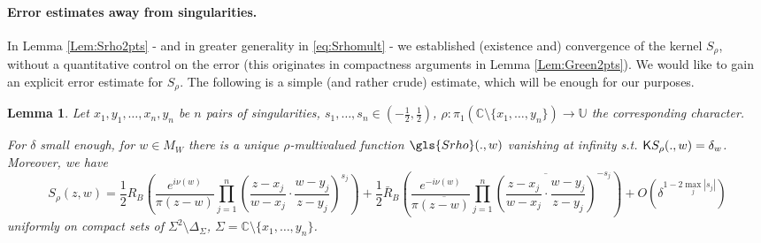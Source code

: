 \documentclass[10pt]{article}
\newcommand{\C}{\mathbb{C}}
\newcommand{\U}{\mathbb{U}}
\newcommand{\rK}{{\sf K}}
\newtheorem{Lem}[thm]{Lemma}
\begin{document}
\paragraph{Error estimates away from singularities.\\}

In Lemma \ref{Lem:Srho2pts} - and in greater generality in \eqref{eq:Srhomult} - we established (existence and) convergence of the kernel $S_\rho$, without a quantitative control on the error (this originates in compactness arguments in Lemma \ref{Lem:Green2pts}).
We would like to gain an explicit error estimate for $S_\rho$. The following is a simple (and rather crude) estimate, which will be enough for our purposes.

\begin{Lem}\label{Lem:Srhoquant}
Let $x_1,y_1,\dots,x_n,y_n$ be $n$ pairs of singularities, $s_1,\dots,s_n\in(-\frac 12,\frac 12)$, $\rho:\pi_1(\C\setminus\{x_1,\dots,y_n\})\rightarrow\U$ the corresponding character. 

For $\delta$ small enough, for $w\in M_W$ there is a unique $\rho$-multivalued function $\gls{Srho}(.,w)$ vanishing at infinity s.t. $\rK S_\rho(.,w)=\delta_w$. Moreover, we have
$$S_\rho(z,w)=\frac 12R_B\left(\frac{e^{i\nu(w)}}{\pi(z-w)}\prod_{j=1}^n\left(\frac{z-x_j}{w-x_j}\cdot\frac{w-y_j}{z-y_j}\right)^{s_j}\right)
+\frac 12\bar R_B\left(\frac{e^{-i\nu(w)}}{\pi\overline{(z-w)}}\prod_{j=1}^n\overline{\left(\frac{z-x_j}{w-x_j}\cdot\frac{w-y_j}{z-y_j}\right)}^{-{s_j}}\right)+O(\delta^{1-2\max_j|s_j|})$$
uniformly on compact sets of $\Sigma^2\setminus\Delta_\Sigma$, $\Sigma=\C\setminus\{x_1,\dots,y_n\}$.
\end{Lem}
\end{document}
